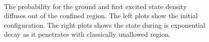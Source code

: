 \documentclass[singlepage,notitlepage,nofootinbib,11pt]{revtex4-1}
\begin{document}
\begin{figure}[h]
  \centering
  \captionsetup[subfigure]{labelformat=empty}
  \\
  \caption{\label{decaying} The probability for the ground and first excited state density diffuses out of the confined region. The left plots show the initial configuration. The right plots shows the state during is exponential decay as it penetrates with classically unallowed region.}
\end{figure}
\end{document}
